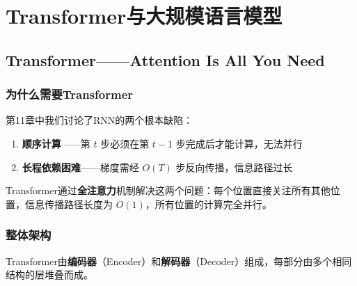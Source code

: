 
\chapter{Transformer与大规模语言模型}


\section{Transformer——Attention Is All You Need}

\subsection{为什么需要Transformer}

第11章中我们讨论了RNN的两个根本缺陷：
\begin{enumerate}
    \item \textbf{顺序计算}——第 $t$ 步必须在第 $t-1$ 步完成后才能计算，无法并行
    \item \textbf{长程依赖困难}——梯度需经 $O(T)$ 步反向传播，信息路径过长
\end{enumerate}

Transformer通过\textbf{全注意力}机制解决这两个问题：每个位置直接关注所有其他位置，信息传播路径长度为 $O(1)$，所有位置的计算完全并行。

\subsection{整体架构}

Transformer由\textbf{编码器}（Encoder）和\textbf{解码器}（Decoder）组成，每部分由多个相同结构的层堆叠而成。


